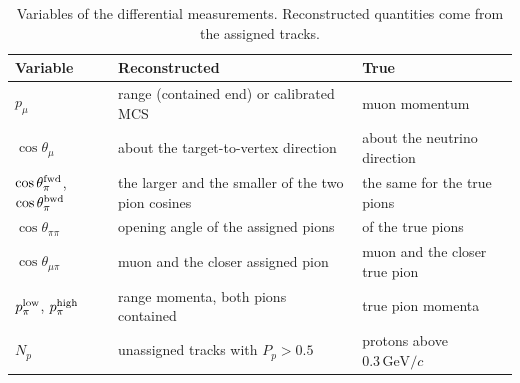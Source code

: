 \documentclass[11pt,a4paper]{article}
\newcommand{\GeVc}{\,\text{GeV}\!/c}
\begin{document}
\begin{table}[H]
  \centering
  \caption{Variables of the differential measurements. Reconstructed quantities come from the assigned tracks.}
  \label{tab:vardef}
  \small
  \begin{tabular}{lL{6.2cm}L{5.0cm}}
    \toprule
    Variable & Reconstructed & True \\
    \midrule
    $p_\mu$ & range (contained end) or calibrated MCS & muon momentum \\
    $\cos\theta_\mu$ & about the target-to-vertex direction & about the neutrino direction \\
    $\cos\theta_\pi^{\rm fwd}$, $\cos\theta_\pi^{\rm bwd}$ & the larger and the smaller of the two pion cosines & the same for the true pions \\
    $\cos\theta_{\pi\pi}$ & opening angle of the assigned pions & of the true pions \\
    $\cos\theta_{\mu\pi}$ & muon and the closer assigned pion & muon and the closer true pion \\
    $p_\pi^{\rm low}$, $p_\pi^{\rm high}$ & range momenta, both pions contained & true pion momenta \\
    $N_p$ & unassigned tracks with $P_p>0.5$ & protons above $0.3\GeVc$ \\
    \bottomrule
  \end{tabular}
\end{table}
\end{document}
